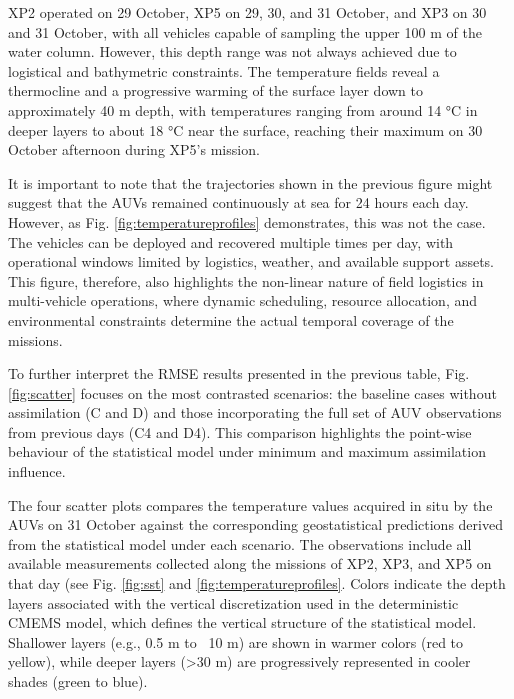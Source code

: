 XP2 operated on 29 October, XP5 on 29, 30, and 31 October, and XP3 on 30
and 31 October, with all vehicles capable of sampling the upper 100 m of
the water column. However, this depth range was not always achieved due
to logistical and bathymetric constraints. The temperature fields reveal
a thermocline and a progressive warming of the surface layer down to
approximately 40 m depth, with temperatures ranging from around 14 °C in
deeper layers to about 18 °C near the surface, reaching their maximum on
30 October afternoon during XP5’s mission.

It is important to note that the trajectories shown in the previous
figure might suggest that the AUVs remained continuously at sea for 24
hours each day. However, as Fig. \ref{fig:temperatureprofiles}
demonstrates, this was not the case. The vehicles can be deployed and
recovered multiple times per day, with operational windows limited by
logistics, weather, and available support assets. This figure,
therefore, also highlights the non-linear nature of field logistics in
multi-vehicle operations, where dynamic scheduling, resource allocation,
and environmental constraints determine the actual temporal coverage of
the missions.


To further interpret the RMSE results presented in the previous table, Fig. \ref{fig:scatter} focuses on the most contrasted scenarios: the baseline cases without assimilation (C and D) and those incorporating the full set of AUV observations from previous days (C4 and D4). This comparison highlights the point-wise behaviour of the statistical model under minimum and maximum assimilation influence.

The four scatter plots compares the temperature values acquired in situ by the AUVs on 31 October against the corresponding geostatistical predictions derived from the statistical model under each scenario. The observations include all available measurements collected along the missions of XP2, XP3, and XP5 on that day (see Fig. \ref{fig:sst} and \ref{fig:temperatureprofiles}. Colors indicate the depth layers associated with the vertical discretization used in the deterministic CMEMS model, which defines the vertical structure of the statistical model. Shallower layers (e.g., 0.5 m to ~10 m) are shown in warmer colors (red to yellow), while deeper layers (>30 m) are progressively represented in cooler shades (green to blue).

